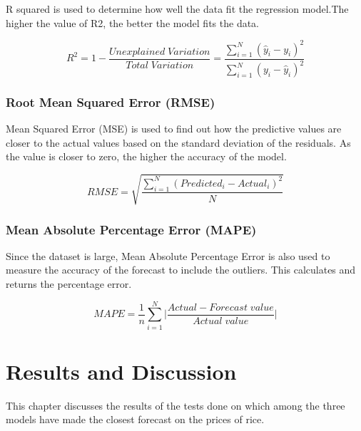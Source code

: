 \documentclass[runningheads]{llncs}
\begin{document}
R squared is used to determine how well the data fit the regression model.The higher the value of R2, the better the model fits the data. 

\begin{equation}
	R^2 = 1- \frac{Unexplained \;Variation}{Total \; Variation} = \frac{ \sum_{i=1}^{N} (\hat{y}_i- y_i)^2  }{ \sum_{i=1}^{N} (y_i - \hat{y}_i)^2 }
\end{equation}

\subsubsection{Root Mean Squared Error (RMSE)}
Mean Squared Error (MSE) is used to find out how the predictive values are closer to the actual values based on the standard deviation of the residuals. As the value is closer to zero, the higher the accuracy of the model. 

\begin{equation}
	RMSE = \sqrt{\frac{\sum_{i=1}^{N} (Predicted_i - Actual_i)^2}{N}}
\end{equation}

\subsubsection{Mean Absolute Percentage Error (MAPE)}
Since the dataset is large, Mean Absolute Percentage Error is also used to measure the accuracy of the forecast to include the outliers. This calculates and returns the percentage error.

\begin{equation}
	MAPE = \frac{1}{n} \sum_{i=1}^{N} \Bigg | \frac{Actual-Forecast\; value}{Actual\;value} \Bigg |
\end{equation}

\section{Results and Discussion}
This chapter discusses the results of the tests done on which among the three models have made the closest forecast on the prices of rice.
\end{document}
